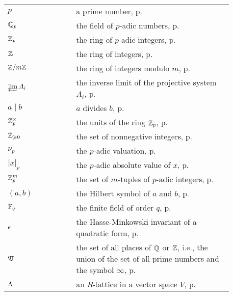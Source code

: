 \begin{longtable}{p{0.25\linewidth} p{0.01\linewidth} p{0.65\linewidth}}
    \(p\) && a prime number, p.\,\pageref{chap:local-global-principle}\\
    \(\mathbb{Q}_p\) && the field of \(p\)-adic numbers, p.\,\pageref{chap:local-global-principle}\\
    \(\mathbb{Z}_p\) && the ring of \(p\)-adic integers, p.\,\pageref{chap:local-global-principle}\\
    \(\mathbb{Z}\) && the ring of integers, p.\,\pageref{chap:local-global-principle}\\
    \(\mathbb{Z}/m\mathbb{Z}\) && the ring of integers modulo \(m\), p.\,\pageref{chap:local-global-principle}\\
    \(\varprojlim A_i\) && the inverse limit of the projective system \(A_i\), p.\,\pageref{chap:local-global-principle}\\
    \(a \mid b\) && \(a\) divides \(b\), p.\,\pageref{thm:criterion-units-of-zp}\\
    \(\mathbb{Z}_p^{\times}\) && the units of the ring \(\mathbb{Z}_p\), p.\,\pageref{thm:criterion-units-of-zp}\\
    \(\mathbb{Z}_{\geqslant 0}\) && the set of nonnegative integers, p.\,\pageref{thm:criterion-units-of-zp}\\
    \(\nu_p\) && the \(p\)-adic valuation, p.\,\pageref{thm:criterion-units-of-zp}\\
    \(|x|_p\) && the \(p\)-adic absolute value of \(x\), p.\,\pageref{thm:criterion-units-of-zp}\\
    \(\mathbb{Z}_p^m\) && the set of \(m\)-tuples of \(p\)-adic integers, p.\,\pageref{thm:criterion-units-of-zp}\\
    \((a, b)\) && the Hilbert symbol of \(a\) and \(b\), p.\,\pageref{sec:hilbert-symbol}\\
    \(\mathbb{F}_q\) && the finite field of order \(q\), p.\,\pageref{sec:results-from-witt}\\
    \(\epsilon\) && the Hasse-Minkowski invariant of a quadratic form, p.\,\pageref{sec:hasse-invariant}\\
    \(\mathfrak{V}\) && the set of all places of \(\mathbb{Q}\) or \(\mathbb{Z}\), i.e., the union of the set of all prime numbers and the symbol \(\infty\), p.\,\pageref{sec:hasse-minkowski}\\
    \(\Lambda\) && an \(R\)-lattice in a vector space \(V\), p.\,\pageref{sec:lattice}\\
\end{longtable}